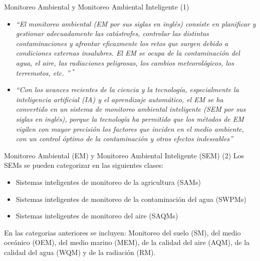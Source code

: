 \documentclass[aspectratio=169,compress]{beamer}
\begin{document}
\begin{frame}{Monitoreo Ambiental y Monitoreo Ambiental Inteligente (1)}
	\begin{itemize}  %
		\item \textit{``El monitoreo ambiental (EM por sus siglas en inglés) consiste en planificar y gestionar adecuadamente las catástrofes, controlar las distintas contaminaciones y afrontar eficazmente los retos que surgen debido a condiciones externas insalubres. El EM se ocupa de la contaminación del agua, el aire, las radiaciones peligrosas, los cambios meteorológicos, los terremotos, etc. '' \cite{s20113113}$^*$}
		\item \textit{``Con los avances recientes de la ciencia y la tecnología, especialmente la inteligencia artificial (IA) y el aprendizaje automático, el EM se ha convertido en un sistema de monitoreo ambiental inteligente (SEM por sus siglas en inglés), porque la tecnología ha permitido que los métodos de EM vigilen con mayor precisión los factores que inciden en el medio ambiente, con un control óptimo de la contaminación y otros efectos indeseables''}
	\end{itemize}
\end{frame}


\begin{frame}{Monitoreo Ambiental (EM) y Monitoreo Ambiental Inteligente (SEM) (2)}
Los SEMs se pueden categorizar en las siguientes clases:
\begin{itemize}
\item Sistemas inteligentes de monitoreo de la agricultura (SAMs) 
\item Sistemas inteligentes de monitoreo de la contaminación del agua (SWPMs)
\item Sistemas inteligentes de monitoreo del aire (SAQMs)
\end{itemize}
En las categorias anteriores se incluyen:  Monitoreo del suelo (SM), del medio oceánico (OEM), del medio marino (MEM), de la calidad del aire
(AQM), de la calidad del agua (WQM) y de la radiación (RM).
\end{frame}
\end{document}
